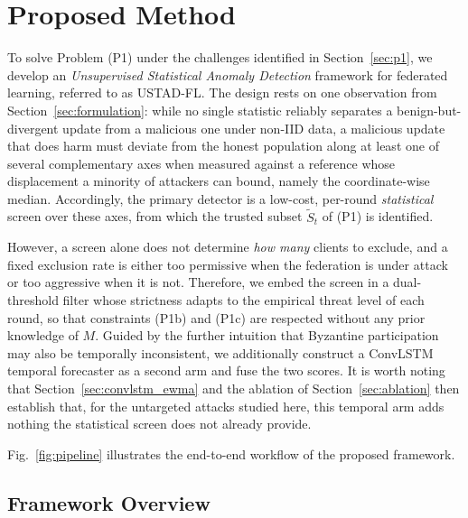\documentclass[journal]{IEEEtran}
\begin{document}
\section{Proposed Method}
\label{sec:method}

To solve Problem (P1) under the challenges identified in Section~\ref{sec:p1}, we develop an \emph{Unsupervised Statistical Anomaly Detection} framework for federated learning, referred to as USTAD-FL. The design rests on one observation from Section~\ref{sec:formulation}: while no single statistic reliably separates a benign-but-divergent update from a malicious one under non-IID data, a malicious update that does harm must deviate from the honest population along at least one of several complementary axes when measured against a reference whose displacement a minority of attackers can bound, namely the coordinate-wise median. Accordingly, the primary detector is a low-cost, per-round \emph{statistical} screen over these axes, from which the trusted subset $\widetilde{S}_t$ of (P1) is identified.

However, a screen alone does not determine \emph{how many} clients to exclude, and a fixed exclusion rate is either too permissive when the federation is under attack or too aggressive when it is not. Therefore, we embed the screen in a dual-threshold filter whose strictness adapts to the empirical threat level of each round, so that constraints (P1b) and (P1c) are respected without any prior knowledge of $M$. Guided by the further intuition that Byzantine participation may also be temporally inconsistent, we additionally construct a ConvLSTM temporal forecaster as a second arm and fuse the two scores. It is worth noting that Section~\ref{sec:convlstm_ewma} and the ablation of Section~\ref{sec:ablation} then establish that, for the untargeted attacks studied here, this temporal arm adds nothing the statistical screen does not already provide.

Fig.~\ref{fig:pipeline} illustrates the end-to-end workflow of the proposed framework.

\subsection{Framework Overview}
\end{document}
